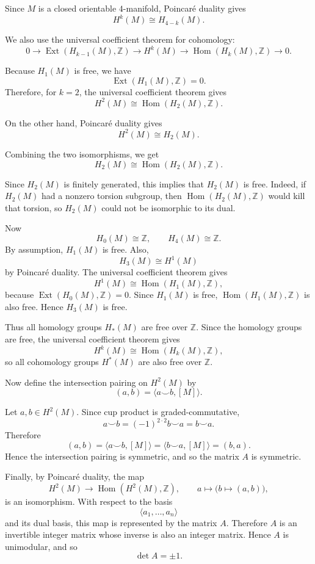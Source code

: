 \begin{solution}
Since \(M\) is a closed orientable \(4\)-manifold, Poincaré duality gives
\[
H^k(M)\cong H_{4-k}(M).
\]

We also use the universal coefficient theorem for cohomology:
\[
0\longrightarrow \operatorname{Ext}(H_{k-1}(M),\mathbb Z)
\longrightarrow H^k(M)
\longrightarrow \operatorname{Hom}(H_k(M),\mathbb Z)
\longrightarrow 0.
\]

Because \(H_1(M)\) is free, we have
\[
\operatorname{Ext}(H_1(M),\mathbb Z)=0.
\]
Therefore, for \(k=2\), the universal coefficient theorem gives
\[
H^2(M)\cong \operatorname{Hom}(H_2(M),\mathbb Z).
\]

On the other hand, Poincaré duality gives
\[
H^2(M)\cong H_2(M).
\]

Combining the two isomorphisms, we get
\[
H_2(M)\cong \operatorname{Hom}(H_2(M),\mathbb Z).
\]

Since \(H_2(M)\) is finitely generated, this implies that \(H_2(M)\) is free. Indeed,
if \(H_2(M)\) had a nonzero torsion subgroup, then
\(\operatorname{Hom}(H_2(M),\mathbb Z)\) would kill that torsion, so
\(H_2(M)\) could not be isomorphic to its dual.

Now
\[
H_0(M)\cong \mathbb Z,
\qquad
H_4(M)\cong \mathbb Z.
\]
By assumption, \(H_1(M)\) is free. Also,
\[
H_3(M)\cong H^1(M)
\]
by Poincaré duality. The universal coefficient theorem gives
\[
H^1(M)\cong \operatorname{Hom}(H_1(M),\mathbb Z),
\]
because \(\operatorname{Ext}(H_0(M),\mathbb Z)=0\). Since \(H_1(M)\) is free,
\(\operatorname{Hom}(H_1(M),\mathbb Z)\) is also free. Hence \(H_3(M)\) is free.

Thus all homology groups \(H_*(M)\) are free over \(\mathbb Z\). Since the homology
groups are free, the universal coefficient theorem gives
\[
H^k(M)\cong \operatorname{Hom}(H_k(M),\mathbb Z),
\]
so all cohomology groups \(H^*(M)\) are also free over \(\mathbb Z\).

Now define the intersection pairing on \(H^2(M)\) by
\[
(a,b)=\langle a\smile b,[M]\rangle.
\]

Let \(a,b\in H^2(M)\). Since cup product is graded-commutative,
\[
a\smile b=(-1)^{2\cdot 2}b\smile a=b\smile a.
\]
Therefore
\[
(a,b)=\langle a\smile b,[M]\rangle
=\langle b\smile a,[M]\rangle
=(b,a).
\]
Hence the intersection pairing is symmetric, and so the matrix \(A\) is symmetric.

Finally, by Poincaré duality, the map
\[
H^2(M)\longrightarrow \operatorname{Hom}(H^2(M),\mathbb Z),
\qquad
a\longmapsto \bigl(b\mapsto (a,b)\bigr),
\]
is an isomorphism. With respect to the basis
\[
\langle a_1,\ldots,a_n\rangle
\]
and its dual basis, this map is represented by the matrix \(A\). Therefore \(A\) is
an invertible integer matrix whose inverse is also an integer matrix. Hence \(A\) is
unimodular, and so
\[
\det A=\pm 1.
\]


\end{solution}
